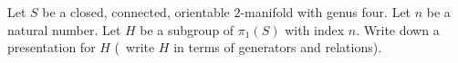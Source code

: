 Let $S$ be a closed, connected, orientable $2$-manifold with genus
four.  Let $n$ be a natural number. Let $H$ be a subgroup of
$\pi_1(S)$ with index $n$. Write down a presentation for $H$ (\ie\
write $H$ in terms of generators and relations).

